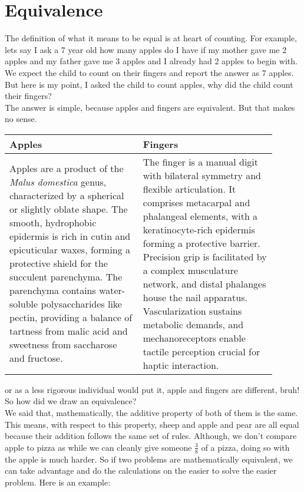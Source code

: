 \section{Equivalence}
The definition of what it means to be equal is at heart of counting. For example, lets say I ask a 7 year old how many apples do I have if my mother gave me 2 apples and my father gave me 3 apples and I already had 2 apples to begin with.\\
We expect the child to count on their fingers and report the answer as 7 apples. But here is my point, I asked the child to count apples, why did the child count their fingers?\\
The answer is simple, because apples and fingers are equivalent. But that makes no sense.
\begin{table}[H]
    \centering
    \begin{tabular}{|p{0.45\linewidth}|p{0.45\linewidth}|}
        \hline
        \textbf{Apples} & \textbf{Fingers} \\
        \hline
        Apples are a product of the \textit{Malus domestica} genus, characterized by a spherical or slightly oblate shape. The smooth, hydrophobic epidermis is rich in cutin and epicuticular waxes, forming a protective shield for the succulent parenchyma. The parenchyma contains water-soluble polysaccharides like pectin, providing a balance of tartness from malic acid and sweetness from saccharose and fructose. & The finger is a manual digit with bilateral symmetry and flexible articulation. It comprises metacarpal and phalangeal elements, with a keratinocyte-rich epidermis forming a protective barrier. Precision grip is facilitated by a complex musculature network, and distal phalanges house the nail apparatus. Vascularization sustains metabolic demands, and mechanoreceptors enable tactile perception crucial for haptic interaction. \\
        \hline
    \end{tabular}
\end{table}
or as a less rigorous individual would put it, apple and fingers are different, bruh!\\
So how did we draw an equivalence?\\
We said that, mathematically, the additive property of both of them is the same. This means, with respect to this property, sheep and apple and pear are all equal because their addition follows the same set of rules. Although, we don't compare apple to pizza as while we can cleanly give someone $\frac{3}{8}$ of a pizza, doing so with the apple is much harder. So if two problems are mathematically equivalent, we can take advantage and do the calculations on the easier to solve the easier problem. Here is an example:\\
